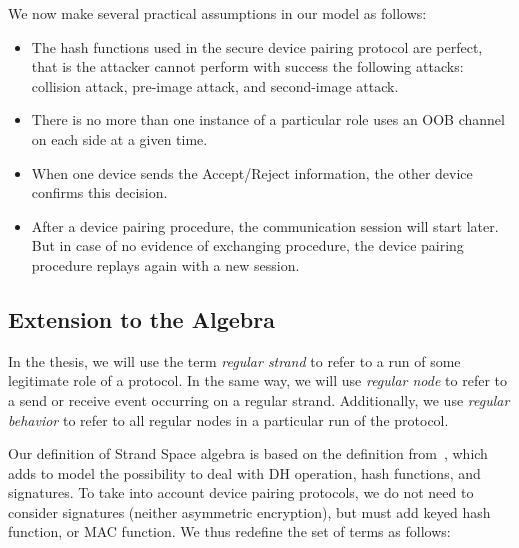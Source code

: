 We now make several practical assumptions in our model as follows: 
\begin{itemize}
\item The hash functions used in the secure device pairing protocol are perfect, that is the attacker cannot perform with success the following attacks: collision attack, pre-image attack, and second-image attack.
\item There is no more than one instance of a particular role uses an OOB channel on each side at a given time.
\item When one device sends the Accept/Reject information, the other device confirms this decision.
\item After a device pairing procedure, the communication session will start later. But in case of no evidence of exchanging procedure, the device pairing procedure replays again with a new session. 
\end{itemize} 

\subsection{Extension to the Algebra}

In the thesis, we will use the term \emph{regular strand} to refer to a run of some legitimate role of a protocol. In the same way, we will use \emph{regular node} to refer to a send or receive event occurring on a regular strand. Additionally, we use \emph{regular behavior} to refer to all regular nodes in a particular run of the protocol.

Our definition of Strand Space algebra is based on the definition from~\cite{1212716}, which adds to model the possibility to deal with DH operation, hash functions, and signatures. To take into account device pairing protocols, we do not need  to consider signatures (neither asymmetric encryption), but must add keyed hash function, or MAC function. We thus redefine the set of terms as follows:

